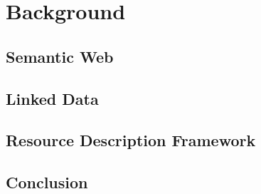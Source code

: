

\chapter{Background}

\ifpdf
    \graphicspath{{2_background/figures/PNG/}{2_background/figures/PDF/}{2_background/figures/}}
\else
    \graphicspath{{2_background/figures/EPS/}{2_background/figures/}}
\fi


\section{Semantic Web}

\section{Linked Data}

\section{Resource Description Framework}

\section{Conclusion}